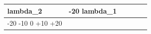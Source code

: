 \begin{tabular}{lrrrrr}
\toprule
lambda_2 & -20%
lambda_1 &  &  &  &  &  \\
\midrule
-20%
-10%
0%
+10%
+20%
\bottomrule
\end{tabular}
